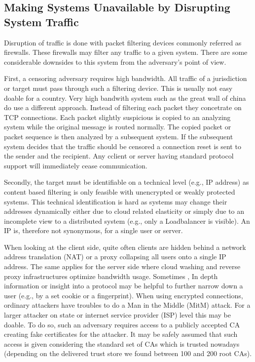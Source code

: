 \subsection{Making Systems Unavailable by Disrupting System Traffic}
Disruption of traffic is done with packet filtering devices commonly referred as firewalls. These firewalls may filter any traffic to a given system. There are some considerable downsides to this system from the adversary's point of view.

First, a censoring adversary requires high bandwidth. All traffic of a jurisdiction or target must pass through such a filtering device. This is usually not easy doable for a country. Very high bandwith system such as the great wall of china do use a different approach. Instead of filtering each packet they concetrate on TCP connections. Each packet slightly suspicious is copied to an analyzing system while the original message is routed normally. The copied packet or packet sequence is then analyzed by a subsequent system. If the subsequent system decides that the traffic should be censored a connection reset is sent to the sender and the recipient. Any cclient or server having standard protocol support will immediately cease communication.

Secondly, the target must be identifiable on a technical level (e.g., IP address) as content based filtering is only feasible with unencrypted or weakly protected systems. This technical identification is hard as systems may change their addresses dynamically either due to cloud related elasticity or simply due to an incomplete view to a distributed system (e.g., only a Loadbalancer is visible). An IP is, therefore not synonymous, for a single user or server. 

When looking at the client side, quite often clients are hidden behind a network address translation (NAT) or a proxy collapsing all users onto a single IP address. The same applies for the server side where cloud washing and reverse proxy infrastructures optimize bandwidth usage. Sometimes , In depth information or insight into a protocol may be helpful to further narrow down a user (e.g., by a set cookie or a fingerprint). When using encrypted connections, ordinary attackers have troubles to do a Man in the Middle (MitM) attack. For a larger attacker on state or internet service provider (ISP) level this may be doable. To do so, such an adversary requires access to a publicly accepted CA creating fake certificates for the attacker. It may be safely assumed that such access is given considering the standard set of CAs which is trusted nowadays (depending on the delivered trust store we found between 100 and 200 root CAs).

